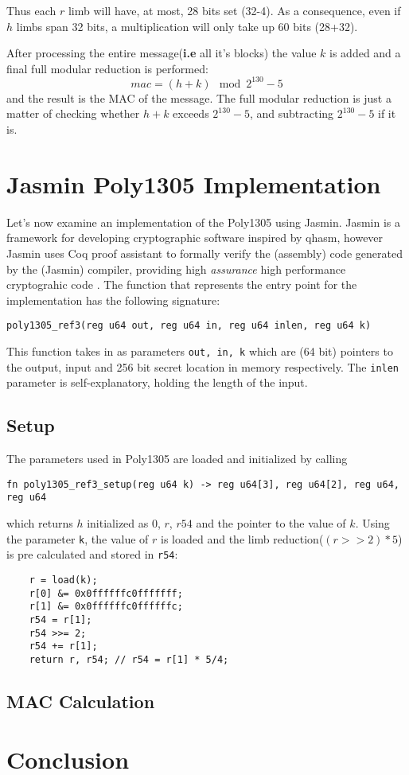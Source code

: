 \documentclass[twocolumn]{article}
\begin{document}
Thus each $r$ limb will have, at most, 28 bits set (32-4). As a consequence, even if $h$ limbs span 32 bits, a multiplication will only take up 60 bits (28+32).

After processing the entire message(\textbf{i.e} all it's blocks) the value $k$ is added and a final full modular reduction is performed:
$$mac = (h+k) \mod{2^{130}-5} $$
and the result is the MAC of the message.
\newline
The full modular reduction is just a matter of checking whether $h+k$ exceeds $2^{130}-5$, and subtracting $2^{130}-5$ if it is.

\section{Jasmin Poly1305 Implementation}
Let's now examine an implementation of the Poly1305 using Jasmin. Jasmin is a framework for developing cryptographic software inspired by qhasm, however Jasmin uses Coq
proof assistant to formally verify the (assembly) code generated by the (Jasmin) compiler, providing high \textit{assurance} high performance cryptograhic code 
\cite{jasmin_paper}. The function that represents the entry point for the implementation has the following signature: 

\begin{verbatim}
poly1305_ref3(reg u64 out, reg u64 in, reg u64 inlen, reg u64 k)
\end{verbatim}

This function takes in as parameters \texttt{out, in, k} which are (64 bit) pointers to the output, input and 256 bit secret location in memory respectively.
The \texttt{inlen} parameter is self-explanatory, holding the length of the input.

\subsection{Setup}
The parameters used in Poly1305 are loaded and initialized by calling 
\begin{verbatim}
fn poly1305_ref3_setup(reg u64 k) -> reg u64[3], reg u64[2], reg u64, reg u64
\end{verbatim}
which returns $h$ initialized as 0, $r$, $r54$ and the pointer to the value of $k$.
Using the parameter \texttt{k}, the value of $r$ is loaded and the limb reduction($(r>>2)*5$) is pre calculated and stored in \texttt{r54}:
\begin{verbatim}
    r = load(k);
    r[0] &= 0x0ffffffc0fffffff;
    r[1] &= 0x0ffffffc0ffffffc;
    r54 = r[1];
    r54 >>= 2;
    r54 += r[1];
    return r, r54; // r54 = r[1] * 5/4;
\end{verbatim}

\subsection{MAC Calculation}

\section{Conclusion}

\printbibliography

\onecolumn
\begin{appendices}
\end{appendices}
\end{document}
